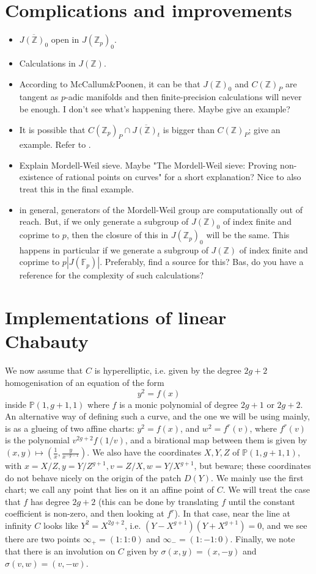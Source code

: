 \documentclass[12pt]{article}
\newcommand{\Z}{\mathbb{Z}}
\renewcommand{\P}{\mathbb{P}}
\newcommand{\F}{\mathbb{F}}
\theoremstyle{plain}
\theoremstyle{definition}
\theoremstyle{remark}
\begin{document}
\section{Complications and improvements}
\label{section:remarks}
\begin{itemize}
\item $\overline{J(\Z)_0}$ open in $J(\Z_p)_0$.
\item Calculations in $J(\Z)$.
\item According to McCallum\&Poonen, it can be that $J(\Z)_0$ and $C(\Z)_P$ are tangent as $p$-adic manifolds and then finite-precision calculations will never be enough. I don't see what's happening there. Maybe give an example? 
\item It is possible that $C(\Z_p)_P \cap \overline{J(\Z)_t}$ is bigger than $C(\Z)_P$; give an example. Refer to \citep{Balakrishnan19}.
\item Explain Mordell-Weil sieve. Maybe "The Mordell-Weil sieve: Proving non-existence of rational points on curves" for a short explanation? Nice to also treat this in the final example.
\item in general, generators of the Mordell-Weil group are computationally out of reach. But, if we only generate a subgroup of $J(\Z)_0$ of index finite and coprime to $p$, then the closure of this in $J(\Z_p)_0$ will be the same. This happens in particular if we generate a subgroup of $J(\Z)$ of index finite and coprime to $p|J(\F_p)|$. Preferably, find a source for this? Bas, do you have a reference for the complexity of such calculations?
\end{itemize}

\section{Implementations of linear Chabauty}
We now assume that $C$ is hyperelliptic, i.e. given by the degree $2g+2$ homogenisation of an equation of the form
\[
y^2 = f(x)
\]
inside $\P(1,g+1,1)$ where $f$ is a monic polynomial of degree $2g+1$ or $2g+2$. An alternative way of defining such a curve, and the one we will be using mainly, is as a glueing of two affine charts: $y^2 = f(x)$, and $w^2 = f^{r}(v)$, where $f^{r}(v)$ is the polynomial $v^{2g + 2} f(1/v)$, and a birational map between them is given by $(x,y) \mapsto (\frac{1}{x},\frac{y}{x^{-g-1}})$. We also have the coordinates $X,Y,Z$ of $\P(1,g+1,1)$, with $x = X/Z, y = Y/Z^{g+1}, v = Z/X, w = Y/X^{g+1}$, but beware; these coordinates do not behave nicely on the origin of the patch $D(Y)$. We mainly use the first chart; we call any point that lies on it an affine point of $C$. We will treat the case that $f$ has degree $2g+2$ (this can be done by translating $f$ until the constant coefficient is non-zero, and then looking at $f^r$). In that case, near the line at infinity $C$ looks like $Y^2 = X^{2g+2}$, i.e. $(Y-X^{g+1})(Y+X^{g+1}) = 0$, and we see there are two points $\infty_+ = (1:1:0)$ and $\infty_- = (1:-1:0)$. Finally, we note that there is an involution on $C$ given by $\sigma(x,y) = (x,-y)$ and $\sigma(v,w) = (v,-w)$.
\end{document}
